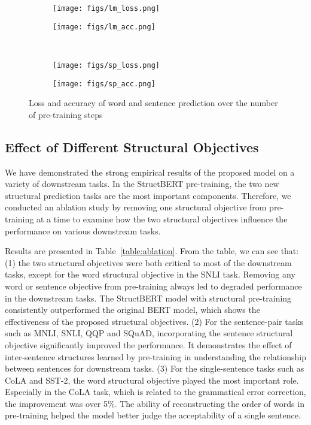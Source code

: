 \documentclass{article}
\begin{document}
\begin{figure*}[b!]
    \centering
    \begin{subfigure}[b]{0.3\textwidth}
        \centering
        \texttt{[image: figs/lm\_loss.png]}
    \end{subfigure}
    \quad\quad
    \begin{subfigure}[b]{0.3\textwidth}  
        \centering 
        \texttt{[image: figs/lm\_acc.png]}
    \end{subfigure}\\
\begin{subfigure}[b]{0.3\textwidth}   
        \centering 
        \texttt{[image: figs/sp\_loss.png]}
    \end{subfigure}
    \quad\quad
    \begin{subfigure}[b]{0.3\textwidth}   
        \centering 
        \texttt{[image: figs/sp\_acc.png]}
    \end{subfigure}
    \caption[]
    {Loss and accuracy of word and sentence prediction over the number of pre-training steps} 
    \label{fig:loss_acc}
\end{figure*}

\subsection{Effect of Different Structural Objectives}
We have demonstrated the strong empirical results of the proposed model on a variety of downstream tasks. In the StructBERT pre-training, the two new structural prediction tasks are the most important components. Therefore, we conducted an ablation study by removing one structural objective from pre-training at a time to examine how the two structural objectives influence the performance on various downstream tasks. 

Results are presented in Table~\ref{table:ablation}. From the table, we can see that: (1) the two structural objectives were both critical to most of the downstream tasks, except for the word structural objective in the SNLI task. Removing any word or sentence objective from pre-training always led to degraded performance in the downstream tasks. The StructBERT model with structural pre-training consistently outperformed the original BERT model, which shows the effectiveness of the proposed structural objectives. (2) For the sentence-pair tasks such as MNLI, SNLI, QQP and SQuAD, incorporating the sentence structural objective significantly improved the performance. It demonstrates the effect of inter-sentence structures learned by pre-training in understanding the relationship between sentences for downstream tasks. (3) For the single-sentence tasks such as CoLA and SST-2, the word structural objective played the most important role. Especially in the CoLA task, which is related to the grammatical error correction, the improvement was over 5\%. The ability of reconstructing the order of words in pre-training helped the model better judge the acceptability of a single sentence.
\end{document}
